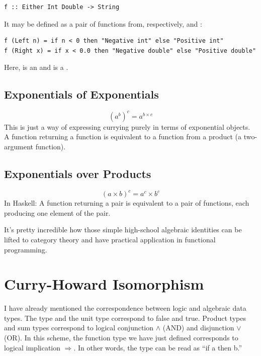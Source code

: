 \begin{Verbatim}
f :: Either Int Double -> String
\end{Verbatim}
It may be defined as a pair of functions from, respectively,
 and :

\begin{verbatim}
f (Left n) = if n < 0 then "Negative int" else "Positive int"
f (Right x) = if x < 0.0 then "Negative double" else "Positive double"
\end{verbatim}
Here,  is an  and  is a .

\subsection{Exponentials of
Exponentials}\label{exponentials-of-exponentials}

\[(a^{b})^{c} = a^{b \times c}\]
This is just a way of expressing currying purely in terms of exponential
objects. A function returning a function is equivalent to a function
from a product (a two-argument function).

\subsection{Exponentials over
Products}\label{exponentials-over-products}

\[(a \times b)^{c} = a^{c} \times b^{c}\]
In Haskell: A function returning a pair is equivalent to a pair of
functions, each producing one element of the pair.

It's pretty incredible how those simple high-school algebraic identities
can be lifted to category theory and have practical application in
functional programming.

\section{Curry-Howard Isomorphism}\label{curry-howard-isomorphism}

I have already mentioned the correspondence between logic and algebraic
data types. The  type and the unit type \code{()}
correspond to false and true. Product types and sum types correspond to
logical conjunction \ensuremath{\wedge} (AND) and disjunction \ensuremath{\vee} (OR). In this scheme, the
function type we have just defined corresponds to logical implication \ensuremath{\Rightarrow}.
In other words, the type  can be read as ``if
a then b.''

